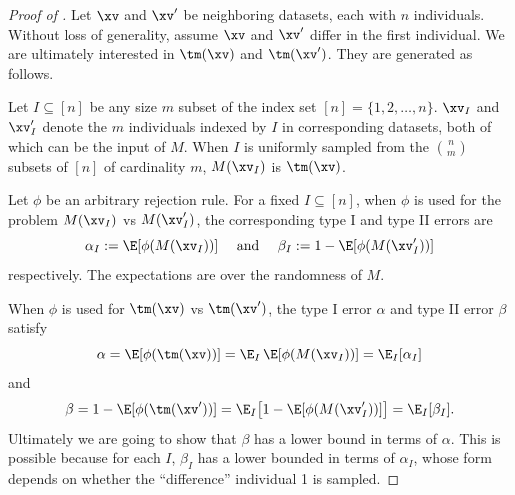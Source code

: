 \begin{proof}[Proof of ]
	Let $\xv$ and $\xv'$ be neighboring datasets, each with $n$ individuals. Without loss of generality, assume $\xv$ and $\xv'$ differ in the first individual. We are ultimately interested in $\tm(\xv)$ and $\tm(\xv')$. They are generated as follows.

	Let $I\subseteq[n]$ be any size $m$ subset of the index set $[n]=\{1,2,\ldots, n\}$. $\xv_I$ and $\xv_I'$ denote the $m$ individuals indexed by $I$ in corresponding datasets, both of which can be the input of $M$. When $I$ is uniformly sampled from the $n\choose m$ subsets of $[n]$ of cardinality $m$, $M(\xv_I)$ is $\tm(\xv)$.


	Let $\phi$ be an arbitrary rejection rule. For a fixed $I\subseteq [n]$, when $\phi$ is used for the problem $M(\xv_I)$ vs $M(\xv'_I)$, the corresponding type I and type II errors are
	\begin{equation}\label{eq:defS}
		\alpha_I:=\E[\phi(M(\xv_I))]\quad\text{ and }\quad\beta_I:=1-\E[\phi(M(\xv'_I))]
	\end{equation}
	respectively. The expectations are over the randomness of $M$.

	When $\phi$ is used for $\tm(\xv)$ vs $\tm(\xv')$, the type I error $\alpha$ and type II error $\beta$ satisfy
	\[
		\alpha=\E[\phi(\tm(\xv))]= \E_I\,\E[\phi(M(\xv_I))] = \E_I[\alpha_I] %
	\]
	and
	\begin{align*}
		\beta=1-\E[\phi(\tm(\xv'))]= \E_I\big[1-\E[\phi(M(\xv'_I))]\big] = \E_I[\beta_I]. %
	\end{align*}
	Ultimately we are going to show that $\beta$ has a lower bound in terms of $\alpha$.
	This is possible because for each $I$, $\beta_I$ has a lower bounded in terms of $\alpha_I$, whose form depends on whether the ``difference'' individual 1 is sampled.


\end{proof}
